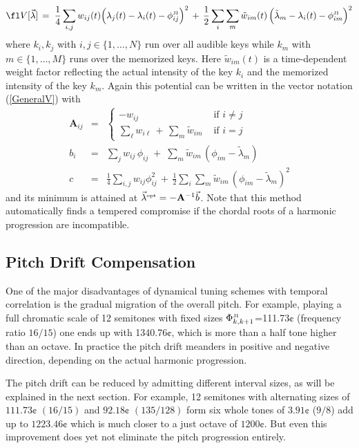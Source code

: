 \begin{equation}
 \fl
V[\vec\lambda] \,=\; \frac14 \sum_{i,j} w_{ij}(t) \Bigl( \lambda_j(t)-\lambda_i(t)-\phi^\JI_{ij}\Bigr)^2 \,+\,
\frac{1}{2} \sum_{i}\sum_{m}\tilde w_{im}(t)\, \Bigl( \tilde\lambda_m-\lambda_i(t)-\phi^\JI_{im}\Bigr)^2
\end{equation}
%
where $k_i,k_j$ with $i,j\in \{1,\ldots, N\}$ run over all audible keys while $k_m$ with  $m\in\{1,\ldots,M\}$ runs over the memorized keys. Here $\tilde w_{im}(t)$ is a time-dependent weight factor reflecting the actual intensity of the key $k_i$ and the memorized intensity of the key $k_m$. Again this potential can be written in the vector notation (\ref{GeneralV}) with
%
\begin{eqnarray}
\label{eqa}
\mathbf{A}_{ij} &=& \left\{
\begin{array}{ll}
-w_{ij} & \mbox{ if } i\neq j  \\
\sum_{\ell} w_{i\ell} \,+\, \sum_m \tilde w_{im} & \mbox{ if } i=j 
\end{array}\right.
\\[2mm]
\label{eqb}
b_i &=& \sum_j w_{ij} \,\phi_{ij} \;+\; \sum_m \tilde w_{im} \,
(\phi_{im}-\tilde\lambda_m) \\
\label{eqc}
c&=&\frac14 \sum_{i,j} w_{ij} \phi_{ij}^2 \,+\, \frac{1}{2} \sum_i \sum_m \tilde w_{im} \,
(\phi_{im}-\tilde\lambda_m)^2
\end{eqnarray}
%
and its minimum is attained at $\vec\lambda^{\rm\scriptscriptstyle opt}=-\mathbf A^{-1}\vec b$. Note that this method automatically finds a tempered compromise if the chordal roots of a harmonic progression are incompatible.

\subsection{Pitch Drift Compensation}
\label{PitchDrift}

One of the major disadvantages of dynamical tuning schemes with temporal correlation is the gradual migration of the overall pitch. For example, playing a full chromatic scale of 12 semitones with  fixed sizes $\Phi_{k,k+1}^{\rm\scriptscriptstyle JI}$=111.73$\cent$ (frequency ratio $16/15$) one ends up with 1340.76$\cent$, which is more than a half tone higher than an octave. In practice the pitch drift meanders in positive and negative direction, depending on the actual harmonic progression.

The pitch drift can be reduced by admitting different interval sizes, as will be explained in the next section. For example, 12  semitones with alternating sizes of $111.73\cent$ $(16/15)$ and $92.18\cent$ $(135/128)$ form six whole tones of $3.91\cent$ ($9/8$) add up to $1223.46\cent$ which is much closer to a just octave of $1200\cent$. But even this improvement does yet not eliminate the pitch progression entirely.


